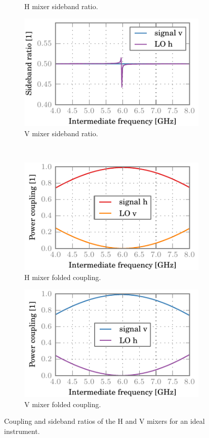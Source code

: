 \begin{figure}[hbtp]
\begin{subfigure}[b]{.5\textwidth}
        \caption{H mixer sideband ratio.}
    \end{subfigure}%
    \begin{subfigure}[b]{.5\textwidth}
        \includegraphics{chapter_3/0_ideal_v_sbr}%
        \caption{V mixer sideband ratio.}
    \end{subfigure}%
    \\
    \begin{subfigure}[b]{.5\textwidth}
        \includegraphics{chapter_3/0_ideal_h_ssb}%
        \caption{H mixer folded coupling.}
    \end{subfigure}%
    \begin{subfigure}[b]{.5\textwidth}
        \includegraphics{chapter_3/0_ideal_v_ssb}%
        \caption{V mixer folded coupling.}
    \end{subfigure}%
    \caption{Coupling and sideband ratios of the H and V mixers for an ideal instrument.}
    \label{fig:0_ideal}
\end{figure}

